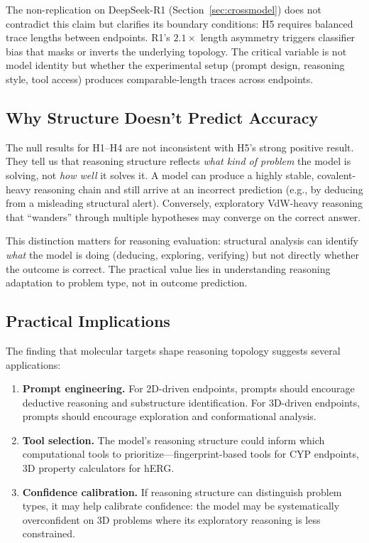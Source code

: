 \documentclass[11pt]{article}
\begin{document}
The non-replication on DeepSeek-R1 (Section~\ref{sec:crossmodel}) does not contradict this claim but clarifies its boundary conditions: H5 requires balanced trace lengths between endpoints. R1's $2.1\times$ length asymmetry triggers classifier bias that masks or inverts the underlying topology. The critical variable is not model identity but whether the experimental setup (prompt design, reasoning style, tool access) produces comparable-length traces across endpoints.

\subsection{Why Structure Doesn't Predict Accuracy}

The null results for H1--H4 are not inconsistent with H5's strong positive result. They tell us that reasoning structure reflects \emph{what kind of problem} the model is solving, not \emph{how well} it solves it. A model can produce a highly stable, covalent-heavy reasoning chain and still arrive at an incorrect prediction (e.g., by deducing from a misleading structural alert). Conversely, exploratory VdW-heavy reasoning that ``wanders'' through multiple hypotheses may converge on the correct answer.

This distinction matters for reasoning evaluation: structural analysis can identify \emph{what} the model is doing (deducing, exploring, verifying) but not directly whether the outcome is correct. The practical value lies in understanding reasoning adaptation to problem type, not in outcome prediction.

\subsection{Practical Implications}

The finding that molecular targets shape reasoning topology suggests several applications:

\begin{enumerate}[leftmargin=*]
    \item \textbf{Prompt engineering.} For 2D-driven endpoints, prompts should encourage deductive reasoning and substructure identification. For 3D-driven endpoints, prompts should encourage exploration and conformational analysis.

    \item \textbf{Tool selection.} The model's reasoning structure could inform which computational tools to prioritize---fingerprint-based tools for CYP endpoints, 3D property calculators for hERG.

    \item \textbf{Confidence calibration.} If reasoning structure can distinguish problem types, it may help calibrate confidence: the model may be systematically overconfident on 3D problems where its exploratory reasoning is less constrained.
\end{enumerate}
\end{document}
